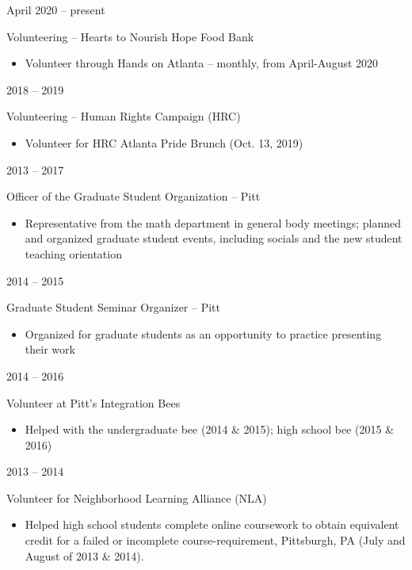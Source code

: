 \documentclass[a4paper,10pt]{article}
\newlength{\cvcolumngapwidth}
\newlength{\cvleftcolumnwidth}
\newlength{\cvrightcolumnwidth}
\newcommand{\cvtitlestyle}[1]{{\large\cvtitlefont\textcolor{cvtitlecolor}{#1}}}
\newcommand{\cvheadingstyle}[1]{{\normalsize\cvheadingfont\textcolor{cvheadingcolor}{#1}}}
\newlength{\cvafteritemskipamount}
\newlength{\cvaftertitleskipamount}
\newlength{\cvparskip}
\newcommand{\cvitem}[2]{
    \begin{minipage}[t]{\cvleftcolumnwidth}
        \raggedleft #1
    \end{minipage}%
    \hspace{\cvcolumngapwidth}%
    \begin{minipage}[t]{\cvrightcolumnwidth}
        \setlength{\parskip}{\cvparskip} #2
    \end{minipage}

    \vspace{\cvafteritemskipamount}
}
\newcommand{\cvtitle}[1]{
    \cvtitlestyle{#1}

    \vspace{\cvaftertitleskipamount}
    \vspace{-\cvparskip}
}
\begin{document}
\cvitem{
    \cvheadingstyle{April 2020 -- present}
}{
    \cvtitle{Volunteering -- Hearts to Nourish Hope Food Bank}

    \begin{itemize}[leftmargin=*]
    	\item  Volunteer through Hands on Atlanta -- monthly, from April-August 2020

    \end{itemize}

}


\cvitem{
    \cvheadingstyle{2018 -- 2019}
}{
    \cvtitle{Volunteering -- Human Rights Campaign (HRC)}

    \begin{itemize}[leftmargin=*]
    	\item Volunteer for HRC Atlanta Pride Brunch (Oct. 13, 2019)

    \end{itemize}

}




\cvitem{
    \cvheadingstyle{2013 -- 2017}
}{
    \cvtitle{Officer of the Graduate Student Organization -- Pitt}
    \begin{itemize}[leftmargin=*]
        \item Representative from the math department in general body meetings; planned and organized graduate student events, including socials and the new student teaching orientation
    \end{itemize}
    }

\cvitem{
    \cvheadingstyle{2014 -- 2015}
}{
    \cvtitle{Graduate Student Seminar Organizer -- Pitt}
    \begin{itemize}[leftmargin=*]
        \item Organized for graduate students as an opportunity to practice presenting their work
    \end{itemize}
    }



  \cvitem{
    \cvheadingstyle{2014 -- 2016}
}{
    \cvtitle{Volunteer at Pitt's Integration Bees}
    \begin{itemize}[leftmargin=*]
       	\item Helped with the undergraduate bee (2014 \& 2015); high school bee (2015 \& 2016)
    \end{itemize}  
}

  \cvitem{
    \cvheadingstyle{2013 -- 2014}
}{
    \cvtitle{Volunteer for Neighborhood Learning Alliance (NLA)}
    \begin{itemize}[leftmargin=*]
       	\item Helped high school students complete online coursework to obtain equivalent
credit for a failed or incomplete course-requirement, Pittsburgh, PA (July and August of 2013 \& 2014).
    \end{itemize}  
}
\end{document}
